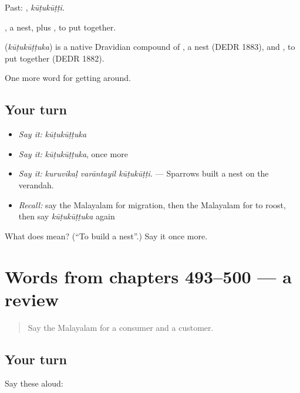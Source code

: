 Past: , \emph{kūṭukūṭṭi}.

, a nest, plus , to put together.

\begin{cousinweb}
\textbf{} (\emph{kūṭukūṭṭuka}) is a native Dravidian compound of , a nest (DEDR 1883), and , to put together (DEDR 1882).
\end{cousinweb}

\begin{grammarlens}[title={What you've built}]
One more word for getting around.
\end{grammarlens}

\subsection*{Your turn}
\begin{itemize}
\raggedright
  \item \emph{Say it:} \emph{kūṭukūṭṭuka}
  \item \emph{Say it:} \emph{kūṭukūṭṭuka}, once more
  \item \emph{Say it:} \emph{kuruvikaḷ varāntayil kūṭukūṭṭi.} — Sparrows built a nest on the verandah.
  \item \emph{Recall:} say the Malayalam for migration, then the Malayalam for to roost, then say \emph{kūṭukūṭṭuka} again
\end{itemize}

\begin{tcolorbox}[breakable,colback=teal!4,colframe=teal!35!black,title={Before you move on}]
What does  mean? (\textquotedblleft{}To build a nest\textquotedblright{}.) Say it once more.
\end{tcolorbox}
\section[(dialogue)]{Words from chapters 493–500 — a review}

\label{lesson:ML-R500-review-493-500}



\begin{quote}
Say the Malayalam for a consumer and a customer.
\end{quote}

\subsection*{Your turn}
Say these aloud:

